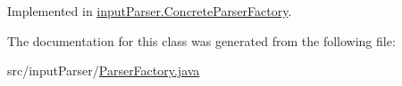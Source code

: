 Implemented in \hyperlink{classinput_parser_1_1_concrete_parser_factory_a022ebe49ba99090793ad4a10b3f8fbfe}{input\-Parser.\-Concrete\-Parser\-Factory}.



The documentation for this class was generated from the following file\-:\begin{DoxyCompactItemize}
\item 
src/input\-Parser/\hyperlink{_parser_factory_8java}{Parser\-Factory.\-java}\end{DoxyCompactItemize}
